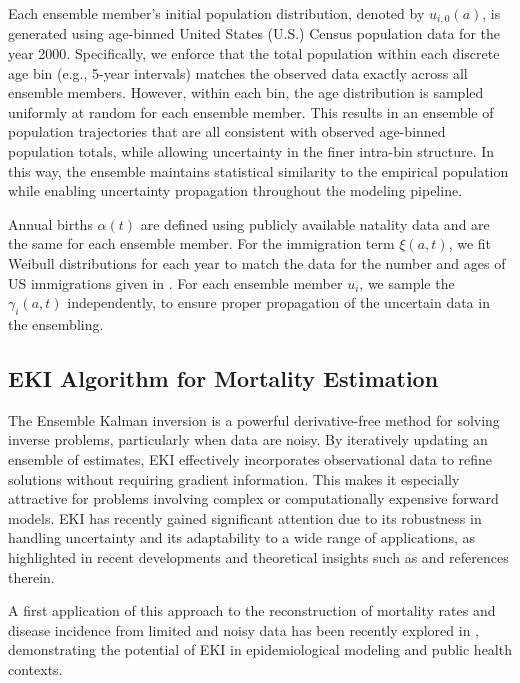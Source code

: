 \documentclass{article}
\begin{document}
Each ensemble member’s initial population distribution, denoted by $u_{i,0}(a)$, is generated using age-binned United States (U.S.) Census population data for the year 2000. Specifically, we enforce that the total population within each discrete age bin (e.g., 5-year intervals) matches the observed data exactly across all ensemble members. However, within each bin, the age distribution is sampled uniformly at random for each ensemble member. This results in an ensemble of population trajectories that are all consistent with observed age-binned population totals, while allowing uncertainty in the finer intra-bin structure. In this way, the ensemble maintains statistical similarity to the empirical population while enabling uncertainty propagation throughout the modeling pipeline.

Annual births $\alpha(t)$ are defined using publicly available natality data \cite{cdc_wonder} and are the same for each ensemble member.  For the immigration term $\xi(a,t)$, we fit Weibull distributions for each year to match the data for the number and ages of US immigrations given in \cite{camarota_cis_2021}. For each ensemble member $u_i$, we sample the $\gamma_i(a,t)$ independently, to ensure proper propagation of the uncertain data in the ensembling. 

\subsection{EKI Algorithm for Mortality Estimation}

The Ensemble Kalman inversion is a powerful derivative-free method for solving inverse problems, particularly when data are noisy. By iteratively updating an ensemble of estimates, EKI effectively incorporates observational data to refine solutions without requiring gradient information. This makes it especially attractive for problems involving complex or computationally expensive forward models. EKI has recently gained significant attention due to its robustness in handling uncertainty and its adaptability to a wide range of applications, as highlighted in recent developments and theoretical insights such as \cite{herty2019kinetic,herty13recent,schillings2017analysis, herty2023filtering,Li2020} and references therein.
\par A first application of this approach to the reconstruction of mortality rates and disease incidence from limited and noisy data has been recently explored in \cite{viguerie2025aging}, demonstrating the potential of EKI in epidemiological modeling and public health contexts.
\end{document}
